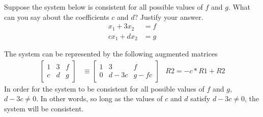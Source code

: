 \documentclass{mathhomework}
\begin{document}
\pagebreak
\begin{problem}[1.1\#27]
    Suppose the system below is consistent for all possible values of $f$ and $g$. What can you say about the coefficients $c$ and $d$? Justify your answer.
    \begin{align*}
        x_1 + 3x_2 & = f \\
        cx_1 + dx_2 & = g
    \end{align*}

    \begin{solution}
        The system can be represented by the following augmented matrices
        \begin{align*}
            \begin{bmatrix}
                1 & 3 & f \\
                c & d & g
            \end{bmatrix}
            & \equiv
            \begin{bmatrix}
                1 & 3 & f \\
                0 & d - 3c & g - fc
            \end{bmatrix}
            & R2 = -c * R1 + R2
        \end{align*}
        In order for the system to be consistent for all possible values of $f$ and $g$, $d - 3c \neq 0$. In other words, so long as the values of $c$ and $d$ 
        satisfy $d - 3c \neq 0$, the system will be consistent.
    \end{solution}
\end{problem}
\end{document}
